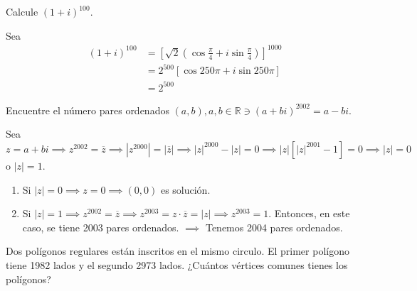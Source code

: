 \begin{ejemplo}
    Calcule $(1+i)^{100}$. 
    \begin{sol}
        Sea 
        \begin{align*}
            (1+i)^{100}  &= \left[\sqrt{2}\left(\cos\frac{\pi}{4}+i\sin \frac{\pi}{4}\right)\right]^{1000}\\
            &= 2^{500}\left[\cos 250\pi +i \sin 250\pi\right]\\
            &= 2^{500}
        \end{align*}
    \end{sol}
\end{ejemplo}

\begin{ejemplo}
    Encuentre el número pares ordenados $(a,b), a,b\in\mathbb{R}\ni (a+bi)^{2002}=a-bi$.
    \begin{sol}
        Sea $z=a+bi\implies z^{2002}=\overline{z}\implies |z^{2000}|=|\overline{z}|\implies |z|^{2000}-|z| = 0\implies |z|\left[|z|^{2001}-1\right]=0\implies |z|=0$ o $|z|=1$. 
        \begin{enumerate}
            \item Si $|z|=0\implies z=0\implies (0,0)$ es solución. 
            \item Si $|z|=1\implies z^{2002}=\overline{z}\implies z^{2003}=z\cdot \overline{z}=|z|\implies z^{2003}=1$. Entonces, en este caso, se tiene 2003 pares ordenados. $\implies$ Tenemos 2004 pares ordenados. 
        \end{enumerate}
    \end{sol}
\end{ejemplo}

\begin{ejemplo}[**]
    Dos polígonos regulares están inscritos en el mismo circulo. El primer polígono tiene 1982 lados y el segundo 2973 lados. ¿Cuántos vértices comunes tienes los polígonos?
    \begin{sol}
        
    \end{sol}
\end{ejemplo}